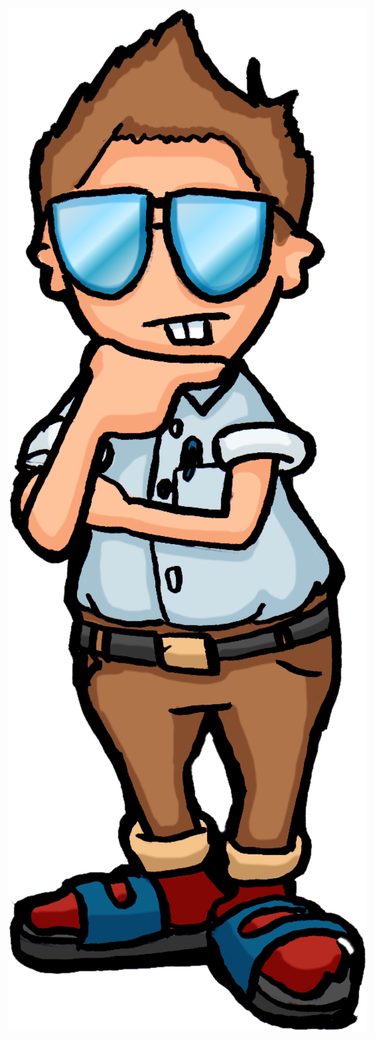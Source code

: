 \begin{frame}[fragile]
\begin{columns}
		\includegraphics[width=\textwidth]{pics/toptip.png}
	\end{columns}
\end{frame}